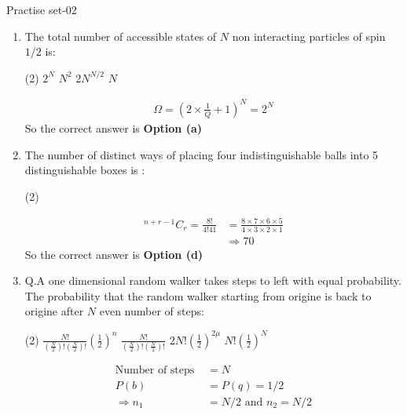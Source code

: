 \newpage
\begin{abox}
	Practise set-02
\end{abox}
\begin{enumerate}
	\item The total number of accessible states of $N$ non interacting particles of spin $1/2$ is:
	 \begin{tasks}(2)
		\task[\textbf{a.}]$2^{N}$
		\task[\textbf{b.}]$N^{2}$
		\task[\textbf{c.}]$2 N^{N / 2}$
		\task[\textbf{d.}]  $N$
	\end{tasks}
	\begin{answer}
		\begin{align*}
		\Omega=\left(2 \times \frac{1}{Q}+1\right)^{N}=2^{N}
		\end{align*}
		So the correct answer is \textbf{Option (a)}
	\end{answer}
	\item The number of distinct ways of placing four indistinguishable balls into 5 distinguishable boxes is :
	 \begin{tasks}(2)
	\end{tasks}
	\begin{answer}
		\begin{align*}
		{ }^{n+r-1} C_{r}=\frac{8 !}{4 ! 41}&=\frac{8 \times 7 \times 6 \times 5}{4 \times 3 \times 2 \times 1}\\
		&\Rightarrow70
		\end{align*}
			So the correct answer is \textbf{Option (d)}
	\end{answer}
	\item Q.A one dimensional random walker takes steps to left with equal probability.  The probability that the random walker starting from origine is back to origine after $N$ even number of steps:
	 \begin{tasks}(2)
		\task[\textbf{a.}]$\frac{N !}{\left(\frac{N}{2}\right) !\left(\frac{N}{2}\right) !}\left(\frac{1}{2}\right)^{n}$
		\task[\textbf{b.}]$\frac{N !}{\left(\frac{N}{2}\right) !\left(\frac{N}{2}\right) !}$
		\task[\textbf{c.}] $2N!\left(\frac{1}{2}\right)^{2 \mu}$
		\task[\textbf{d.}] $N !\left(\frac{1}{2}\right)^{N}$
	\end{tasks}
	\begin{answer}
		\begin{align*}
		\text{Number of steps }&=N\\
		P(b)&=P(q)=1/2 \\
		\Rightarrow n_{1}&=N / 2 \text { and } n_{2}=N / 2\\

\end{align*}
\end{answer}
\end{enumerate}
